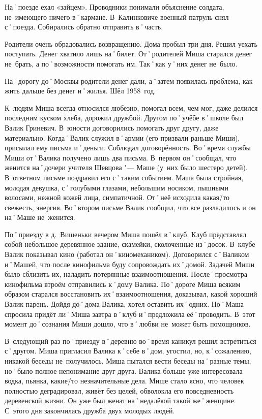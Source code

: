 На˚поезде ехал «зайцем». Проводники понимали объяснение солдата, не~имеющего ничего в˚кармане. В~Калинковиче военный патруль снял с˚поезда. Собирались обратно отправить в˚часть. 

Родители очень обрадовались возвращению. Дома пробыл три дня. Решил уехать поступать. Денег хватило лишь на˚билет. От˚родителей Миша старался денег не~брать, а по˚возможности помогать им. Так˚как у˚них денег не~было.

На˚дорогу до˚Москвы родители денег дали, а˚затем появилась проблема, как жить дальше без денег и˚жилья. Шёл 1958~год.

К~людям Миша всегда относился любезно, помогал всем, чем мог, даже делился последним куском хлеба, дорожил дружбой. Другом по˚учёбе в˚школе был Валик Гриневич. В~юности договорились помогать друг другу, даже материально. Когда˚Валик служил в˚армии (его призвали раньше Миши), присылал ему письма и˚деньги. Соблюдал договорённость. Во˚время службы Миши от˚Валика получено лишь два письма. В~первом он˚сообщал, что женится на˚дочери учителя Шевцова "--- Маше (у~них было шестеро детей). В~ответном письме поздравил его с˚таким событием. Маша была стройная, молодая девушка, с˚голубыми глазами, небольшим носиком, пышными волосами, нежной кожей лица, симпатичной. От˚неё исходила какая\=/то свежесть, энергия. Во˚втором письме Валик сообщил, что все разладилось и он на˚Маше не~женится.

По˚приезду в д.~Вишеньки вечером Миша пошёл в˚клуб. Клуб представлял собой небольшое деревянное здание, скамейки, сколоченные из˚досок. В~клубе Валик показывал кино (работал он˚киномехаником). Договорился с˚Валиком и˚Машей, что после кинофильма буду сопровождать их˚домой. Задачей Миши было сблизить их, наладить потерянные взаимоотношения. После˚просмотра кинофильма втроём отправились к˚дому Валика. По˚дороге Миша всяким образом старался восстановить их˚взаимоотношения, доказывал, какой хороший Валик парень. Дойдя до˚дома Валика, хотел оставить их˚одних. Но˚Маша спросила придёт ли˚Миша завтра в˚клуб и˚предложила её˚проводить. В~этот момент до˚сознания Миши дошло, что в˚любви не~может быть помощников.

В~следующий раз по˚приезду в˚деревню во˚время каникул решил встретиться с˚другом. Миша пригласил Валика к˚себе в˚дом, угостил, но, к˚сожалению, никакой беседы не~получилось. Миша пытался вести беседы на˚разные темы, но˚было полное непонимание друг друга. Валика больше уже интересовала водка, пьянка, какие\=/то незначительные дела. Мише стало ясно, что человек полностью деградировал, живёт без целей, обволокла его повседневность деревенской жизни. Он уже был женат на˚недалёкой такой же˚женщине. С~этого дня закончилась дружба двух молодых людей.
